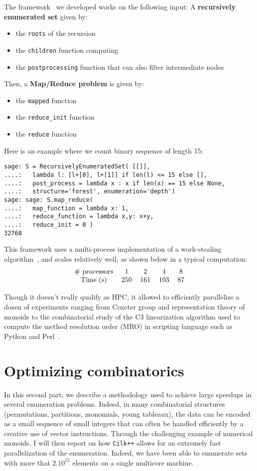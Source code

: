 \documentclass{deliverablereport}
\newcommand{\CilkP}{\texttt{Cilk++}\xspace}
\begin{document}
The framework~\cite{map-reduce} we developed works on the following input:
A \textbf{recursively enumerated set} given by:
\begin{itemize}
\item the \texttt{roots} of the recursion
\item the \texttt{children} function computing
\item the \texttt{postprocessing} function that can also filter intermediate
  nodes
\end{itemize}
Then, a \textbf{Map/Reduce problem} is given by:
\begin{itemize}
\item the \texttt{mapped} function
\item the \verb|reduce_init| function
\item the \texttt{reduce} function
\end{itemize}
Here is an example where we count binary sequence of length 15:
\begin{verbatim}
sage: S = RecursivelyEnumeratedSet( [[]],
....:   lambda l: [l+[0], l+[1]] if len(l) <= 15 else [],
....:   post_process = lambda x : x if len(x) == 15 else None,
....:   structure='forest', enumeration='depth') 
sage: sage: S.map_reduce(
....:   map_function = lambda x: 1,
....:   reduce_function = lambda x,y: x+y,
....:   reduce_init = 0 )
32768
\end{verbatim}
This framework uses a multi-process implementation of a work-stealing
algorithm~\cite{BlumofeL99}, and scales relatively well, as shown below in a
typical computation:
\[\begin{tabular}{ccccc}
\# processors & 1 & 2 & 4 & 8 \\
Time (s) & 250& 161& 103 & 87 \\
\end{tabular}
\]

Though it doesn't really qualify as HPC, it allowed to efficiently
parallelize a dozen of experiments ranging from Coxeter group and
representation theory of monoids to the combinatorial study of the C3
linearization algorithm used to compute the method resolution order (MRO) in
scripting language such as Python and Perl~\cite{C3-controled}.

\section{Optimizing combinatorics}

In this second part, we describe a methodology used to achieve large speedups
in several enumeration problems. Indeed, in many combinatorial structures
(permutations, partitions, monomials, young tableaux), the data can be encoded
as a small sequence of small integers that can often be handled efficiently by
a creative use of vector instructions. Through the challenging example of
numerical monoids, I will then report on how \CilkP allows for an extremely
fast parallelization of the enumeration. Indeed, we have been able to
enumerate sets with more that $2.10^{15}$ elements on a single multicore
machine.
\end{document}
